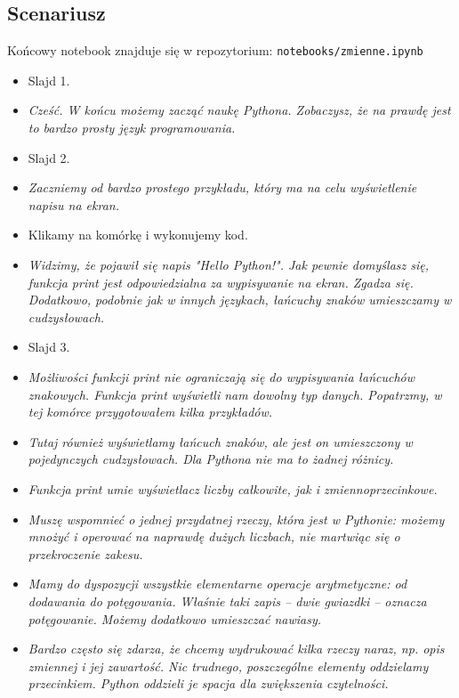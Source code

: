 \documentclass{mwart}
\begin{document}
\subsection{Scenariusz}
Końcowy notebook znajduje się w repozytorium: \texttt{notebooks/zmienne.ipynb}
\begin{itemize}
  \item Slajd 1.
  \item \emph{Cześć. W końcu możemy zacząć naukę Pythona. Zobaczysz, że na prawdę jest
      to bardzo prosty język programowania.}
  \item Slajd 2.
  \item \emph{Zaczniemy od bardzo prostego przykładu, który ma na celu wyświetlenie
      napisu na ekran.}
  \item Klikamy na komórkę i wykonujemy kod.
  \item \emph{Widzimy, że pojawił się napis "Hello Python!". Jak pewnie domyślasz się,
      funkcja print jest odpowiedzialna za wypisywanie na ekran. Zgadza się. Dodatkowo,
      podobnie jak w innych językach, łańcuchy znaków umieszczamy w cudzysłowach.}
  \item Slajd 3.
  \item \emph{Możliwości funkcji print nie ograniczają się do wypisywania łańcuchów
      znakowych. Funkcja print wyświetli nam dowolny typ danych. Popatrzmy, w tej
      komórce przygotowałem kilka przykładów. }
  \item \emph{Tutaj również wyświetlamy łańcuch znaków, ale jest on umieszczony w
      pojedynczych cudzysłowach. Dla Pythona nie ma to żadnej różnicy.}
  \item \emph{Funkcja print umie wyświetlacz liczby całkowite, jak i zmiennoprzecinkowe.}
  \item \emph{Muszę wspomnieć o jednej przydatnej rzeczy, która jest w Pythonie: możemy
      mnożyć i operować na naprawdę dużych liczbach, nie martwiąc się o przekroczenie
      zakesu.}
  \item \emph{Mamy do dyspozycji wszystkie elementarne operacje arytmetyczne: od
      dodawania do potęgowania. Właśnie taki zapis -- dwie gwiazdki -- oznacza
      potęgowanie. Możemy dodatkowo umieszczać nawiasy.}
  \item \emph{Bardzo często się zdarza, że chcemy wydrukować kilka rzeczy naraz, np.
      opis zmiennej i jej zawartość. Nic trudnego, poszczególne elementy oddzielamy
      przecinkiem. Python oddzieli je spacja dla zwiększenia czytelności.}


\end{itemize}
\end{document}

